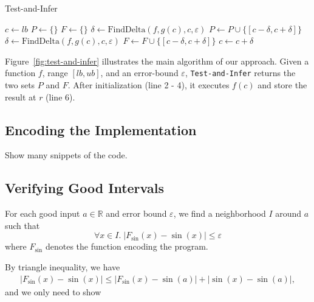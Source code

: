 \begin{algorithm}
  \centering
  \caption{Test-and-Infer}
  \label{fig:test-and-infer}
  \begin{algorithmic}[1]
        \State $c \gets lb$
        \State $P \gets \{\}$
        \State $F \gets \{\}$
                \State $\delta \gets \mathrm{FindDelta}(f, g(c), c, \varepsilon)$
                \State $P \gets P \cup
                                \{ [c - \delta, c + \delta] \}$
            \Else
                \State $\delta \gets \mathrm{FindDelta}(f, g(c), c, \varepsilon)$
                \State $F \gets F \cup
                                \{ [c - \delta, c + \delta] \}$
            \EndIf
            \State $c \gets c + \delta$
        \EndWhile
    \EndProcedure
  \end{algorithmic}
\end{algorithm}

Figure~\ref{fig:test-and-infer} illustrates the main algorithm of our
approach. Given a function $f$, range $[lb, ub]$, and an error-bound
$\varepsilon$, \texttt{Test-and-Infer} returns the two sets $P$ and
$F$. After initialization (line 2 - 4), it executes $f(c)$ and store
the result at $r$ (line 6).

\subsection{Encoding the Implementation}






Show many snippets of the code. 





\subsection{Verifying Good Intervals}
For each good input $a\in \mathbb{R}$ and error bound $\varepsilon$,
we find a neighborhood $I$ around $a$ such that
$$\forall x\in I.\; |F_{\sin}(x)-\sin(x)|\leq \varepsilon$$
where $F_{\sin}$ denotes the function encoding the program.

By triangle inequality, we have
\begin{eqnarray}
|F_{\sin}(x) - \sin(x)| \leq |F_{\sin}(x) - \sin(a)| + |\sin(x) - \sin(a)|,
\end{eqnarray}
and we only need to show

